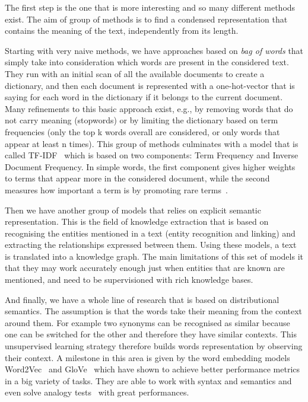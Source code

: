 The first step is the one that is more interesting and so many different methods exist.
The aim of group of methods is to find a condensed representation that contains the meaning of the text, independently from its length.

Starting with very naive methods, we have approaches based on \emph{bag of words} that simply take into consideration which words are present in the considered text.
They run with an initial scan of all the available documents to create a dictionary, and then each document is represented with a one-hot-vector that is saying for each word in the dictionary if it belongs to the current document.
Many refinements to this basic approach exist, e.g., by removing words that do not carry meaning (stopwords) or by limiting the dictionary based on term frequencies (only the top k words overall are considered, or only words that appear at least n times).
This group of methods culminates with a model that is called TF-IDF~\cite{jones1972statistical} which is based on two components: Term Frequency and Inverse Document Frequency.
In simple words, the first component gives higher weights to terms that appear more in the considered document, while the second measures how important a term is by promoting rare terms~\cite{jones1972statistical}.

Then we have another group of models that relies on explicit semantic representation. This is the field of knowledge extraction that is based on recognising the entities mentioned in a text (entity recognition and linking) and extracting the relationships expressed between them. Using these models, a text is translated into a knowledge graph.
The main limitations of this set of models it that they may work accurately enough just when entities that are known are mentioned, and need to be supervisioned with rich knowledge bases.

And finally, we have a whole line of research that is based on distributional semantics.
The assumption is that the words take their meaning from the context around them. For example two synonyms can be recognised as similar because one can be switched for the other and therefore they have similar contexts.
This unsupervised learning strategy therefore builds words representation by observing their context.
A milestone in this area is given by the word embedding models Word2Vec~\cite{mikolov2013efficient} and GloVe~\cite{pennington2014glove} which have shown %
to achieve better performance metrics in a big variety of tasks.
They are able to work with syntax and semantics and even solve analogy tests~\cite{mikolov2013efficient} with great performances.


